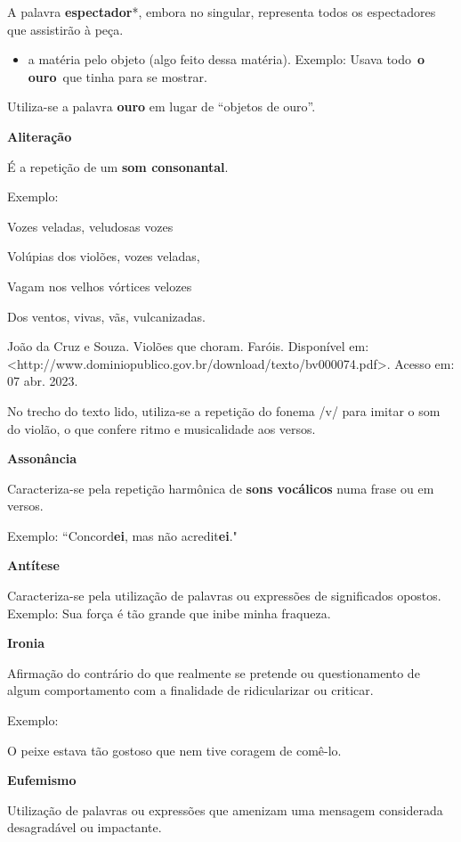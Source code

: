 \begin{itemize}
\begin{itemize}
{A palavra \textbf{espectador}*, embora no singular, representa todos os
espectadores que assistirão à peça.

\begin{itemize}
\tightlist
\item
  a matéria pelo objeto (algo feito dessa matéria). Exemplo: Usava
  todo~\textbf{o ouro}~que tinha para se mostrar.
\end{itemize}

Utiliza-se a palavra \textbf{ouro} em lugar de ``objetos de ouro''.

\textbf{Aliteração}

É a repetição de um \textbf{som consonantal}.

Exemplo:

Vozes veladas, veludosas vozes

Volúpias dos violões, vozes veladas,

Vagam nos velhos vórtices velozes

Dos ventos, vivas, vãs, vulcanizadas.

João da Cruz e Souza. Violões que choram. Faróis. Disponível em:
\textless{}http://www.dominiopublico.gov.br/download/texto/bv000074.pdf\textgreater{}.
Acesso em: 07 abr. 2023.

No trecho do texto lido, utiliza-se a repetição do fonema /v/ para
imitar o som do violão, o que confere ritmo e musicalidade aos versos.

\textbf{Assonância}

Caracteriza-se pela repetição harmônica de \textbf{sons vocálicos} numa
frase ou em versos.

Exemplo: ``Concord\textbf{ei}, mas não acredit\textbf{ei}."

\textbf{Antítese}

Caracteriza-se pela utilização de palavras ou expressões de significados
opostos. Exemplo: Sua força é tão grande que inibe minha fraqueza.

\textbf{Ironia}

Afirmação do contrário do que realmente se pretende ou questionamento de
algum comportamento com a finalidade de ridicularizar ou criticar.

Exemplo:

O peixe estava tão gostoso que nem tive coragem de comê-lo.

\textbf{Eufemismo}

Utilização de palavras ou expressões que amenizam uma mensagem
considerada desagradável ou impactante.

}
\end{itemize}
\end{itemize}
